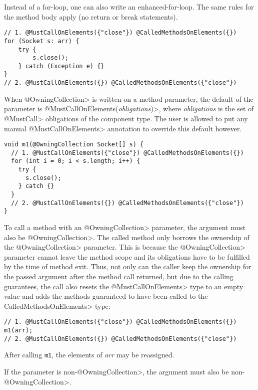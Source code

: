 Instead of a for-loop, one can also write an enhanced-for-loop. The same rules for the method body apply (no return or break statements).
\begin{verbatim}
// 1. @MustCallOnElements({"close"}) @CalledMethodsOnElements({})
for (Socket s: arr) {
    try {
        s.close();
    } catch (Exception e) {}
}
// 2. @MustCallOnElements({}) @CalledMethodsOnElements({"close"})
\end{verbatim}

When \<@OwningCollection> is written on a method parameter, the default of the parameter is \<@MustCallOnElements(\textit{obligations})>, where \textit{obligations} is the set of \<@MustCall> obligations of the component type. The user is allowed to put any manual \<@MustCallOnElements> annotation to override this default however.

\begin{verbatim}
void m1(@OwningCollection Socket[] s) {
  // 1. @MustCallOnElements({"close"}) @CalledMethodsOnElements({})
  for (int i = 0; i < s.length; i++) {
    try {
      s.close();
    } catch {}
  }
  // 2. @MustCallOnElements({}) @CalledMethodsOnElements({"close"})
}
\end{verbatim}

To call a method with an \<@OwningCollection> parameter, the argument must also be \<@OwningCollection>. The called method only borrows the ownership of the \<@OwningCollection> parameter. This is because the \<@OwningCollection> parameter cannot leave the method scope and its obligations have to be fulfilled by the time of method exit. Thus, not only can the caller keep the ownership for the passed argument after the method call returned, but due to the calling guarantees, the call also resets the \<@MustCallOnElements> type to an empty value and adds the methods guaranteed to have been called to the \<CalledMethodsOnElements> type:

\begin{verbatim}
// 1. @MustCallOnElements({"close"}) @CalledMethodsOnElements({})
m1(arr);
// 2. @MustCallOnElements({}) @CalledMethodsOnElements({"close"})
\end{verbatim}

After calling \texttt{m1}, the elements of \textit{arr} may be reassigned.

If the parameter is non-\<@OwningCollection>, the argument must also be non-\<@OwningCollection>.

